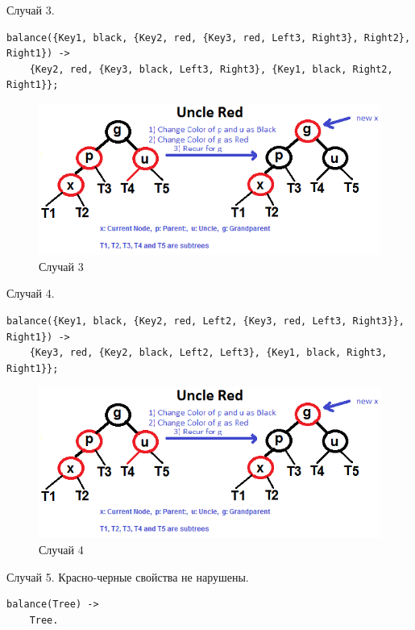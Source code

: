 			Случай 3.
			\begin{lstlisting}
balance({Key1, black, {Key2, red, {Key3, red, Left3, Right3}, Right2}, Right1}) ->  
	{Key2, red, {Key3, black, Left3, Right3}, {Key1, black, Right2, Right1}};	    
			\end{lstlisting}
			\begin{figure}[H]
				\centering
				\includegraphics[width=\textwidth]{img/tan-aus.png}
				\caption{Случай 3}
			\end{figure}
			
			Случай 4.
			\begin{lstlisting}
balance({Key1, black, {Key2, red, Left2, {Key3, red, Left3, Right3}}, Right1}) ->   
	{Key3, red, {Key2, black, Left2, Left3}, {Key1, black, Right3, Right1}};	    
			\end{lstlisting}
			\begin{figure}[H]
				\centering
				\includegraphics[width=\textwidth]{img/tan-aus.png}
				\caption{Случай 4}
			\end{figure}
			
			Случай 5. Красно-черные свойства не нарушены.
			\begin{lstlisting}
balance(Tree) -> 
	Tree.	
			\end{lstlisting}
			
